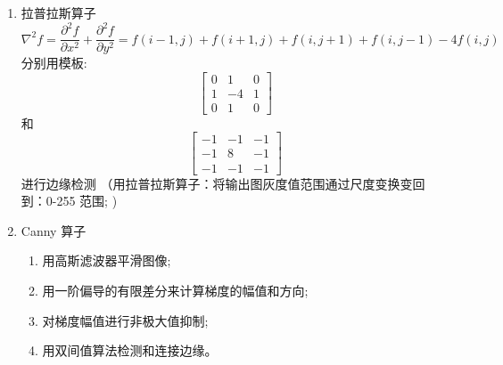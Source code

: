 \documentclass{ctexart}
\begin{document}
\begin{enumerate}
$$\begin{tabular}{|l|l|l|}
                  \hline
              \end{tabular}$$
    \item 拉普拉斯算子
          $$
              \nabla^{2} f=\frac{\partial^{2} f}{\partial x^{2}}+\frac{\partial^{2} f}{\partial y^{2}}=f(i-1, j)+f(i+1, j)+f(i, j+1)+f(i, j-1)-4 f(i, j)
          $$
          分别用模板:
          $$\left[\begin{array}{ccc}0 & 1 & 0 \\ 1 & -4 & 1 \\ 0 & 1 & 0\end{array}\right]$$ 和 $$\left[\begin{array}{ccc}-1 & -1 & -1 \\ -1 & 8 & -1 \\ -1 & -1 & -1\end{array}\right]$$ 进行边缘检测
          （用拉普拉斯算子：将输出图灰度值范围通过尺度变换变回到：0-255 范围; )
    \item Canny 算子
          \begin{enumerate}
              \item 用高斯滤波器平滑图像;
              \item  用一阶偏导的有限差分来计算梯度的幅值和方向;
              \item  对梯度幅值进行非极大值抑制;
              \item  用双间值算法检测和连接边缘。
          \end{enumerate}
\end{enumerate}
\end{document}
